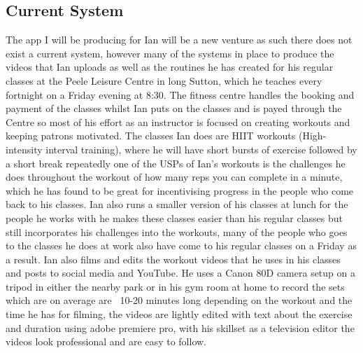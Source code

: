 \documentclass[a4paper]{article}
\begin{document}
	\subsection{Current System}
	The app I will be producing for Ian will be a new venture as such there does not exist a current system, however many of the systems in place to produce the videos that Ian uploads as well as the routines he has created for his regular classes at the Peele Leisure Centre in long Sutton, which he teaches every fortnight on a Friday evening at 8:30. The fitness centre handles the booking and payment of the classes whilst Ian puts on the classes and is payed through the Centre so most of his effort as an instructor is focused on creating workouts and keeping patrons motivated. The classes Ian does are HIIT workouts (High-intensity interval training), where he will have short bursts of exercise followed by a short break repeatedly one of the USPs of Ian’s workouts is the challenges he does throughout the workout of how many reps you can complete in a minute, which he has found to be great for incentivising progress in the people who come back to his classes. Ian also runs a smaller version of his classes at lunch for the people he works with he makes these classes easier than his regular classes but still incorporates his challenges into the workouts, many of the people who goes to the classes he does at work also have come to his regular classes on a Friday as a result. Ian also films and edits the workout videos that he uses in his classes and posts to social media and YouTube. He uses a Canon 80D camera setup on a tripod in either the nearby park or in his gym room at home to record the sets which are on average are ~10-20 minutes long depending on the workout and the time he has for filming, the videos are lightly edited with text about the exercise and duration using adobe premiere pro, with his skillset as a television editor the videos look professional and are easy to follow.
\end{document}
